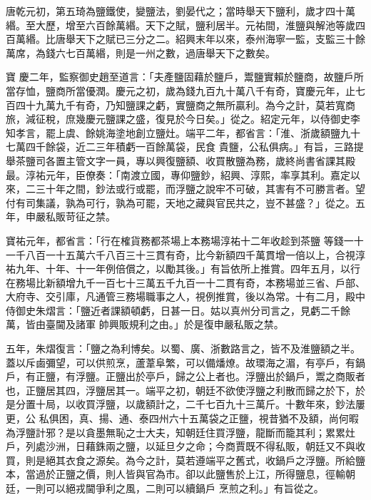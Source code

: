 \begin{pinyinscope}
 唐乾元初，第五琦為鹽鐵使，變鹽法，劉晏代之；當時舉天下鹽利，歲才四十萬緡。至大歷，增至六百餘萬緡。天下之賦，鹽利居半。元祐間，淮鹽與解池等歲四百萬緡。比唐舉天下之賦已三分之二。紹興末年以來，泰州海寧一監，支監三十餘萬席，為錢六七百萬緡，則是一州之數，過唐舉天下之數矣。



 寶
 慶二年，監察御史趙至道言：「夫產鹽固藉於鹽戶，鬻鹽實賴於鹽商，故鹽戶所當存恤，鹽商所當優潤。慶元之初，歲為錢九百九十萬八千有奇，寶慶元年，止七百四十九萬九千有奇，乃知鹽課之虧，實鹽商之無所贏利。為今之計，莫若寬商旅，減征稅，庶幾慶元鹽課之盛，復見於今日矣。」從之。紹定元年，以侍御史李知孝言，罷上虞、餘姚海塗地創立鹽灶。端平二年，都省言：「淮、浙歲額鹽九十七萬四千餘袋，近二三年積虧一百餘萬袋，民食
 貴鹽，公私俱病。」有旨，三路提舉茶鹽司各置主管文字一員，專以興復鹽額、收買散鹽為務，歲終尚書省課其殿最。淳祐元年，臣僚奏：「南渡立國，專仰鹽鈔，紹興、淳熙，率享其利。嘉定以來，二三十年之間，鈔法或行或罷，而浮鹽之說牢不可破，其害有不可勝言者。望付有司集議，孰為可行，孰為可罷，天地之藏與官民共之，豈不甚盛？」從之。五年，申嚴私販苛征之禁。



 寶祐元年，都省言：「行在榷貨務都茶場上本務場淳祐十二年收趁到茶鹽
 等錢一十一千八百一十五萬六千八百三十三貫有奇，比今新額四千萬貫增一倍以上，合視淳祐九年、十年、十一年例倍償之，以勵其後。」有旨依所上推賞。四年五月，以行在務場比新額增九千一百七十三萬五千九百一十二貫有奇，本務場並三省、戶部、大府寺、交引庫，凡通管三務場職事之人，視例推賞，後以為常。十有二月，殿中侍御史朱熠言：「鹽近者課額頓虧，日甚一日。姑以真州分司言之，見虧二千餘萬，皆由臺閫及諸軍
 帥興販規利之由。」於是復申嚴私販之禁。



 五年，朱熠復言：「鹽之為利博矣。以蜀、廣、浙數路言之，皆不及淮鹽額之半。蓋以斥鹵彌望，可以供煎烹，蘆葦阜繁，可以備燔燎。故環海之湄，有亭戶，有鍋戶，有正鹽，有浮鹽。正鹽出於亭戶，歸之公上者也。浮鹽出於鍋戶，鬻之商販者也，正鹽居其四，浮鹽居其一。端平之初，朝廷不欲使浮鹽之利散而歸之於下，於是分置十局，以收買浮鹽，以歲額計之，二千七百九十三萬斤。十數年來，鈔法屢更，公
 私俱困，真、揚、通、泰四州六十五萬袋之正鹽，視昔猶不及額，尚何暇為浮鹽計邪？是以貪墨無恥之士大夫，知朝廷住買浮鹽，龍斷而籠其利；累累灶戶，列處沙洲，日藉銖兩之鹽，以延旦夕之命；今商賈既不得私販，朝廷又不與收買，則是絕其衣食之源矣。為今之計，莫若遵端平之舊式，收鍋戶之浮鹽。所給鹽本，當過於正鹽之價，則人皆與官為市。卻以此鹽售於上江，所得鹽息，徑輸朝廷，一則可以絕戎閫爭利之風，二則可以續鍋戶
 烹煎之利。」有旨從之。



\end{pinyinscope}